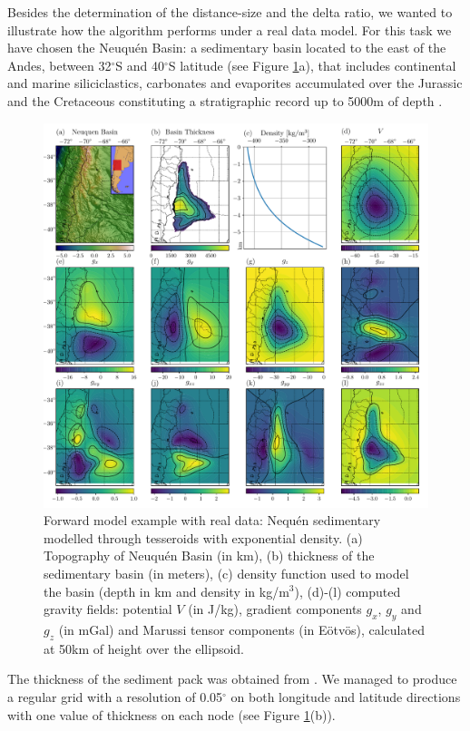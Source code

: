 \documentclass[extra]{gji}
\begin{document}
Besides the determination of the distance-size and the delta ratio, we
wanted to illustrate how the algorithm performs under a real data model.
For this task we have chosen the Neuqu\'en Basin: a sedimentary basin
located to the east of the Andes, between 32$^\circ$S and 40$^\circ$S latitude
(see Figure \ref{fig:neuquen-basin}a), that includes continental and marine
siliciclastics, carbonates and evaporites accumulated over the Jurassic and
the Cretaceous constituting a stratigraphic record up to 5000m of depth
\citep{Howell2005}.

\begin{figure}
\centering
\includegraphics[width=\linewidth]{figures/neuquen-basin.pdf}
\caption{
    Forward model example with real data: Nequ\'en sedimentary modelled
    through tesseroids with exponential density.
    (a) Topography of Neuqu\'en Basin (in km),
    (b) thickness of the sedimentary basin (in meters),
    (c) density function used to model the basin (depth in km and density in
    kg/m$^3$),
    (d)-(l) computed gravity fields: potential $V$ (in J/kg), gradient
    components $g_x$, $g_y$ and $g_z$ (in mGal) and Marussi tensor components
    (in Eötvös), calculated at 50km of height over the ellipsoid.}
\label{fig:neuquen-basin}
\end{figure}

The thickness of the sediment pack was obtained from \citet{Heine2007}.
We managed to produce a regular grid with a resolution of 0.05$^\circ$ on both
longitude and latitude directions with one value of thickness on each node
(see Figure \ref{fig:neuquen-basin}(b)).
\end{document}
